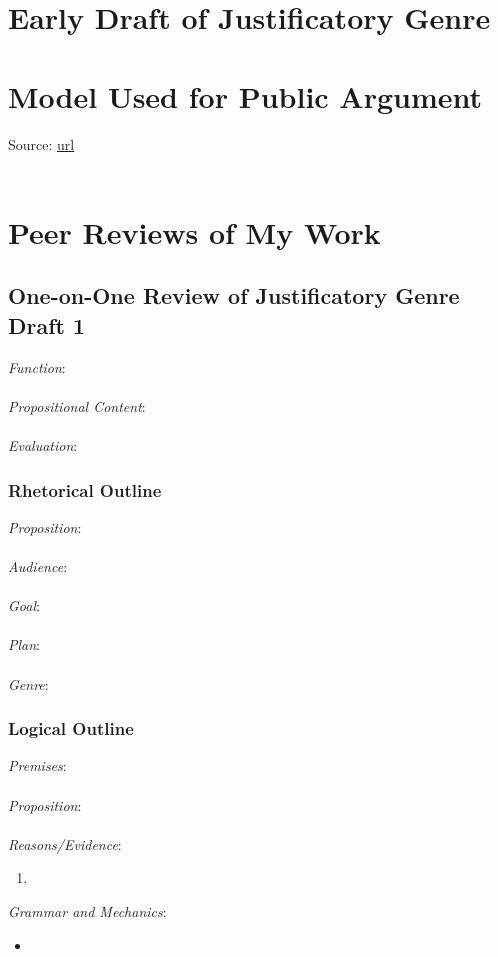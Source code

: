 \documentclass[12pt]{article}
\begin{document}










\newpage
\section{Early Draft of Justificatory Genre}

%
%


\newpage
\section{Model Used for Public Argument}
\noindent Source: \href{url}{url} \\ \\

%
%

\newpage
\section{Peer Reviews of My Work}
\subsection{One-on-One Review of Justificatory Genre Draft 1}
\noindent \textit{Function}: \\ \\
\textit{Propositional Content}: \\ \\
\textit{Evaluation}: 
\subsubsection*{Rhetorical Outline}
\noindent \textit{Proposition}: \\ \\
\textit{Audience}: \\ \\
\textit{Goal}: \\ \\
\textit{Plan}: \\ \\
\textit{Genre}: 
\subsubsection*{Logical Outline}
\noindent\textit{Premises}: \\ \\
\textit{Proposition}: \\ \\
\textit{Reasons/Evidence}:
\begin{enumerate}
	\item 
\end{enumerate}
\textit{Grammar and Mechanics}: 
\begin{itemize}
	\item
\end{itemize}
\end{document}

